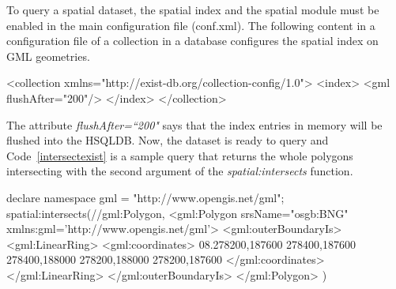 \documentclass[a4paper,12pt]{article}
\begin{document}
To query a spatial dataset, the spatial index and the spatial module must be enabled in the main configuration file (conf.xml). The following content in a configuration file of a collection in a database configures the spatial index on GML geometries. 
\vspace{10px}
\begin{fakeJSON}
<collection xmlns="http://exist-db.org/collection-config/1.0">
  <index>
    <gml flushAfter="200"/>
  </index>
</collection>
\end{fakeJSON}
\vspace{10px}
The attribute \textit{flushAfter=``200"} says that the index entries in memory will be flushed into the HSQLDB. 
Now, the dataset is ready to query and Code~\ref{intersectexist} is a sample query that returns the whole polygons intersecting with the second argument of the \textit{spatial:intersects} function.
\begin{fakeXML}[label=intersectexist,caption=A spatial sample query in eXist-db using the \textit{spatial:intersects} function]
declare namespace gml = "http://www.opengis.net/gml";
spatial:intersects(//gml:Polygon,
  <gml:Polygon srsName="osgb:BNG" xmlns:gml='http://www.opengis.net/gml'>
    <gml:outerBoundaryIs>
      <gml:LinearRing>
        <gml:coordinates>
	  08.278200,187600 278400,187600 278400,188000 278200,188000 278200,187600
	</gml:coordinates>
      </gml:LinearRing>
    </gml:outerBoundaryIs>
  </gml:Polygon>
) 
\end{fakeXML}
\end{document}
